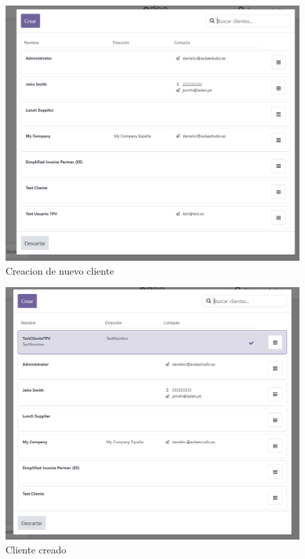 \documentclass[a4paper,12pt]{article}
\begin{document}
\begin{figure}[h!]
    \centering
    \includegraphics[width=1\textwidth]{pr2odoo54-creacionCliente.png}
    \caption{Creacion de nuevo cliente}
\end{figure}
\FloatBarrier

\begin{figure}[h!]
    \centering
    \includegraphics[width=1\textwidth]{pr2odoo55-clienteCreado.png}
    \caption{Cliente creado}
\end{figure}
\FloatBarrier
\end{document}
